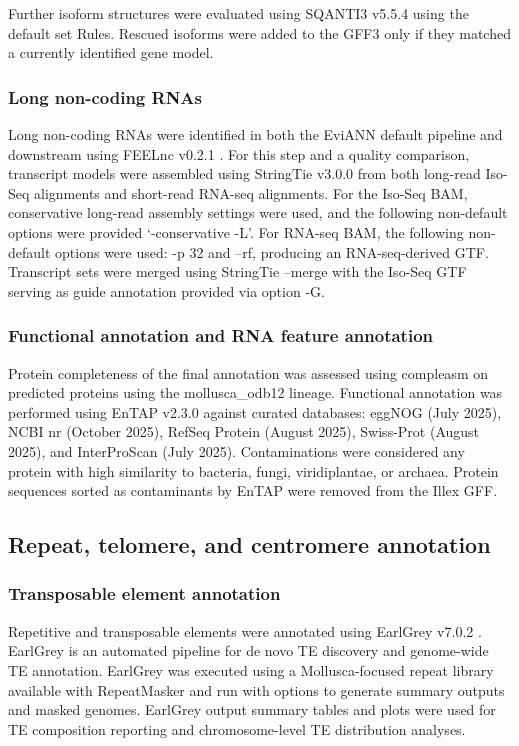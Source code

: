 \documentclass[11pt]{article}
\begin{document}
Further isoform structures were evaluated using SQANTI3 v5.5.4 \cite{Tardaguila2018SQANTI} using the default set Rules. Rescued isoforms were added to the GFF3 only if they matched a currently identified gene model. 

\subsubsection{Long non-coding RNAs}
Long non-coding RNAs were identified in both the EviANN default pipeline and downstream using FEELnc v0.2.1 \cite{Wucher2017FEELnc}. For this step and a quality comparison, transcript models were assembled using StringTie v3.0.0 \cite{Pertea2015StringTie} from both long-read Iso-Seq alignments and short-read RNA-seq alignments. For the Iso-Seq BAM, conservative long-read assembly settings were used, and the following non-default options were provided ‘-conservative -L’. For RNA-seq BAM, the following non-default options were used: -p 32 and --rf, producing an RNA-seq-derived GTF. Transcript sets were merged using StringTie --merge with the Iso-Seq GTF serving as guide annotation provided via option -G.

\subsubsection{Functional annotation and RNA feature annotation}

Protein completeness of the final annotation was assessed using compleasm on predicted proteins using the mollusca\_odb12 lineage. Functional annotation was performed using EnTAP v2.3.0 \cite{Hart2019EnTAP} against curated databases: eggNOG (July 2025), NCBI nr (October 2025), RefSeq Protein (August 2025), Swiss-Prot (August 2025), and InterProScan (July 2025). Contaminations were considered any protein with high similarity to bacteria, fungi, viridiplantae, or archaea. Protein sequences sorted as contaminants by EnTAP were removed from the Illex GFF. 

\subsection{Repeat, telomere, and centromere annotation}

\subsubsection{Transposable element annotation}

Repetitive and transposable elements were annotated using EarlGrey v7.0.2 \cite{Barber2025EarlGrey}. EarlGrey is an automated pipeline for de novo TE discovery and genome-wide TE annotation. EarlGrey was executed using a Mollusca-focused repeat library available with RepeatMasker \cite{Smit2013RepeatMasker} and run with options to generate summary outputs and masked genomes. EarlGrey output summary tables and plots were used for TE composition reporting and chromosome-level TE distribution analyses.
\end{document}
